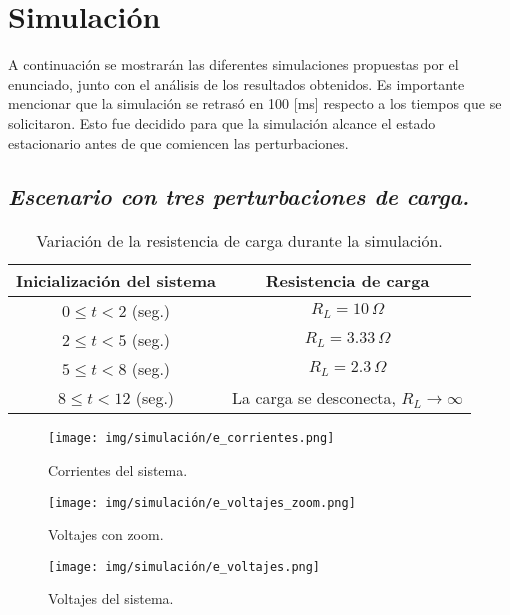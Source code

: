 \section{Simulación}
A continuación se mostrarán las diferentes simulaciones propuestas por el enunciado, junto con el análisis de los resultados obtenidos. Es importante mencionar que la simulación se retrasó en 100 [ms] respecto a los tiempos que se solicitaron. Esto fue decidido para que la simulación alcance el estado estacionario antes de que comiencen las perturbaciones.

\subsection{\textit{Escenario con tres perturbaciones de carga.}}

\begin{table}[H]
\centering
\begin{tabular}{|c|c|}
\hline
\textbf{Inicialización del sistema} & \textbf{Resistencia de carga} \\
\hline
$0 \leq t < 2$ (seg.) & $R_L = 10\,\Omega$ \\
\hline
$2 \leq t < 5$ (seg.) & $R_L = 3.33\,\Omega$ \\
\hline
$5 \leq t < 8$ (seg.) & $R_L = 2.3\,\Omega$ \\
\hline
$8 \leq t < 12$ (seg.) & La carga se desconecta, $R_L \rightarrow \infty$ \\
\hline
\end{tabular}
\caption{Variación de la resistencia de carga durante la simulación.}
\label{tab:e}
\end{table}

\begin{figure}[H]
    \centering
    \texttt{[image: img/simulación/e\_corrientes.png]}
    \caption{Corrientes del sistema.}
    \label{fig:e_corrientes}
\end{figure}

\begin{figure}[H]
    \centering
    \texttt{[image: img/simulación/e\_voltajes\_zoom.png]}
    \caption{Voltajes con zoom.}
    \label{fig:e_voltajes_zoom}
\end{figure}

\begin{figure}[H]
    \centering
    \texttt{[image: img/simulación/e\_voltajes.png]}
    \caption{Voltajes del sistema.}
    \label{fig:e_voltajes}
\end{figure}

